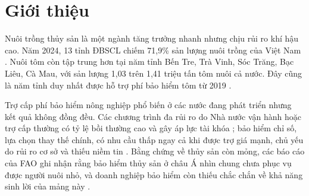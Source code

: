 \documentclass[12pt,a4paper]{article}
\begin{document}
\begin{abstract}
\noindent Các kiểm định bổ sung cho thấy kết quả nhất quán so với kết quả nghiên cứu: SDID tổng sản lượng xấp xỉ 0 ($p$ ngẫu nhiên hóa 0,957); hiểm họa mưa--lũ không dự báo sản lượng hộ (chỉ 4 trong 144 hệ số có $p<0{,}05$; kiểm định tương đương loại trừ hiệu ứng ngoài biên $\pm0{,}20$, và mẫu đủ lực phát hiện hiệu ứng cỡ 0,17); AUC trong tỉnh-năm của chỉ số hạn gần 0,5 ở cả bốn chỉ số; và đánh đổi giữa bỏ sót và chi trả sai không giải được bằng chọn ngưỡng. Hai kết quả không vững và không nên dùng để suy diễn: hệ số bão--sản lượng tôm cấp tỉnh (dấu âm ở mọi đặc tả nhưng ý nghĩa thống kê phụ thuộc đặc tả, và được nhận dạng từ ngoài ĐBSCL) và kết quả riêng cho tôm và cá của đánh giá chương trình (placebo tôm 2010--2012 có ý nghĩa). Với hộ nuôi tôm, mẫu chưa đủ lực để loại hiệu ứng của hiểm họa khô--nóng nhỏ hơn khoảng 0,27. Ràng buộc chính nằm ở thiết kế cơ chế kích hoạt, dữ liệu và phía cung, không phải mức trợ cấp.

\medskip
\noindent\textbf{Từ khóa:} bảo hiểm nông nghiệp; nuôi trồng thủy sản; độ phủ; lựa chọn ngược; rủi ro từ thiện; rủi ro cơ sở; lý thuyết độ tin cậy; sóng nhiệt biển; ĐBSCL.\\
\noindent\textbf{JEL:} Q14, Q22, Q54, G22, H23, O13.
\end{abstract}
\clearpage
\section{Giới thiệu}
\label{sec:intro}

Nuôi trồng thủy sản là một ngành tăng trưởng nhanh nhưng chịu rủi ro khí hậu cao. Năm 2024, 13 tỉnh ĐBSCL chiếm 71,9\% sản lượng nuôi trồng của Việt Nam \parencite{nso_pxweb,fao_fishstat2026}. Nuôi tôm còn tập trung hơn tại năm tỉnh Bến Tre, Trà Vinh, Sóc Trăng, Bạc Liêu, Cà Mau, với sản lượng 1,03 trên 1,41 triệu tấn tôm nuôi cả nước. Đây cũng là năm tỉnh duy nhất được hỗ trợ phí bảo hiểm tôm từ 2019 \parencite{decision22_2019,decision13_2022}.

Trợ cấp phí bảo hiểm nông nghiệp phổ biến ở các nước đang phát triển nhưng kết quả không đồng đều. Các chương trình đa rủi ro do Nhà nước vận hành hoặc trợ cấp thường có tỷ lệ bồi thường cao và gây áp lực tài khóa \parencite{hazell1992,mahul2010}; bảo hiểm chỉ số, lựa chọn thay thế chính, có nhu cầu thấp ngay cả khi được trợ giá mạnh, chủ yếu do rủi ro cơ sở và thiếu niềm tin \parencite{carter2017,jensen2017,cole2013,clarke2016}. Bằng chứng về thủy sản còn mỏng, các báo cáo của FAO ghi nhận rằng bảo hiểm thủy sản ở châu Á nhìn chung chưa phục vụ được người nuôi nhỏ, và doanh nghiệp bảo hiểm còn thiếu chắc chắn về khả năng sinh lời của mảng này \parencite{vananrooy2006,secretan2007}.
\end{document}
